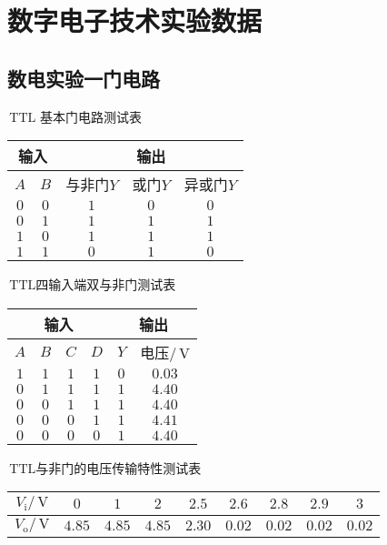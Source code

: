 \documentclass{ctexart}
\renewcommand{\rm}{\,\mathrm}
\begin{document}
    \section{数字电子技术实验数据}
    \subsection{数电实验一\quad 门电路}
    \begin{表}[h]
    	\centering
    	\caption{$\rm{TTL}$ 基本门电路测试表}
    	\begin{tabular}{|c|c|c|c|c|}
    		\hline
    		\multicolumn{2}{|c|}{输入} & \multicolumn{3}{|c|}{输出}\\
    		\hline
    		$A$ & $B$ & 与非门$Y$ & 或门$Y$ & 异或门$Y$\\
    		\hline
    		$0$ & $0$ & $1$ & $0$ & $0$\\
    		\hline
    		$0$ & $1$ & $1$ & $1$ & $1$\\
    		\hline
    		$1$ & $0$ & $1$ & $1$ & $1$\\
    		\hline
    		$1$ & $1$ & $0$ & $1$ & $0$\\
    		\hline
    	\end{tabular}
    \end{表}
    \begin{表}[h]
    	\centering
    	\caption{$\rm{TTL}$四输入端双与非门测试表}
    	\begin{tabular}{|c|c|c|c|c|c|}
    		\hline
    		\multicolumn{4}{|c|}{输入} & \multicolumn{2}{|c|}{输出}\\
    		\hline
    		$A$ & $B$ & $C$ & $D$ & $Y$ & 电压$/\rm{V}$\\
    		\hline
    		$1$ & $1$ & $1$ & $1$ & $0$ & $0.03$\\
    		\hline
    		$0$ & $1$ & $1$ & $1$ & $1$ & $4.40$\\
    		\hline
    		$0$ & $0$ & $1$ & $1$ & $1$ & $4.40$\\
    		\hline
    		$0$ & $0$ & $0$ & $1$ & $1$ & $4.41$\\
    		\hline
    		$0$ & $0$ & $0$ & $0$ & $1$ & $4.40$\\
    		\hline
    	\end{tabular}
    \end{表}
    \begin{表}[h]
    	\centering
    	\caption{$\rm{TTL}$与非门的电压传输特性测试表}
    	\begin{tabular}{|c|c|c|c|c|c|c|c|c|}
    		\hline
    		$V_{\mathrm{i}}/\rm{V}$ & $0$ & $1$ & $2$ & $2.5$ & $2.6$ & $2.8$ & $2.9$ & $3$\\
    		\hline
    		$V_{\mathrm{o}}/\rm{V}$ & $4.85$ & $4.85$ & $4.85$ & $2.30$ & $0.02$ & $0.02$ & $0.02$ & $0.02$\\
    		\hline
    	\end{tabular}
    \end{表}
\end{document}
